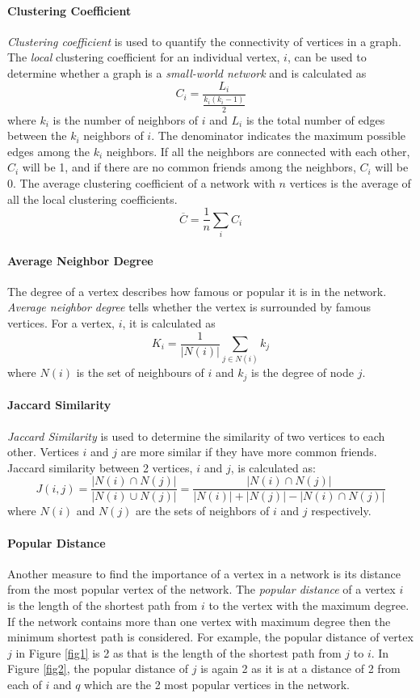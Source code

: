 \documentclass[addpoints]{exam}
\begin{document}
\paragraph{Clustering Coefficient}
\textit{Clustering coefficient} is used to quantify the connectivity of vertices in a graph. The \textit{local} clustering coefficient for an individual vertex, $i$, can be used to determine whether a graph is a \textit{small-world network} and is calculated as
\[
  C_i=  \frac{L_i}{\frac{k_i (k_i-1)}{2}}
\]
where $k_i$ is the number of neighbors of $i$ and $L_i$ is the total number of edges between the $k_i$ neighbors of $i$. The denominator indicates the maximum possible edges among the $k_i$ neighbors. If all the neighbors are connected with each other, $C_i$ will be 1, and if there are no common friends among the neighbors, $C_i$ will be 0. The average clustering coefficient of a network with $n$ vertices is the average of all the local clustering coefficients.
\[
  \overline{C}=  \frac{1}{n} \sum_i C_i
\]

\paragraph{Average Neighbor Degree}

The degree of a vertex describes how famous or popular it is in the network. \textit{Average neighbor degree} tells whether the vertex is surrounded by famous vertices. For a vertex, $i$, it is calculated as
\[
  K_i = \frac{1}{|N(i)|} \sum_{j\in N(i)} k_j
\]
where $N(i)$ is the set of neighbours of $i$ and $k_j$ is the degree of node $j$.

\paragraph{Jaccard Similarity}

\textit{Jaccard Similarity} is used to determine the similarity of two vertices to each other. Vertices $i$ and $j$ are more similar if they have more common friends. Jaccard similarity between 2 vertices, $i$ and $j$, is calculated as:
\[
  J(i,j) =  \frac{|N(i) \cap N(j)|}{|N(i) \cup N(j)|} = \frac{|N(i) \cap N(j)|}{|N(i)|  + |N(j)| - |N(i) \cap N(j)|}
\]
where $N(i)$ and $N(j)$ are the sets of neighbors of $i$ and $j$ respectively.

\paragraph{Popular Distance}
Another measure to find the importance of a vertex in a network is its distance from the most popular vertex of the network. The \textit{popular distance} of a vertex $i$ is the length of the shortest path from $i$ to the vertex with the maximum degree. If the network contains more than one vertex with maximum degree then the minimum shortest path is considered. For example, the popular distance of vertex $j$ in Figure \ref{fig1} is 2 as that is the length of the shortest path from $j$ to $i$. In Figure \ref{fig2}, the popular distance of $j$ is again 2 as it is at a distance of 2 from each of $i$ and $q$ which are the 2 most popular vertices in the network.
\end{document}
